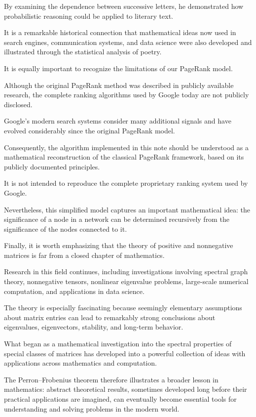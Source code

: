 \documentclass[11pt,a4paper]{article}
\theoremstyle{definition}
\theoremstyle{remark}
\begin{document}
By examining the dependence between
successive letters, he demonstrated
how probabilistic reasoning could
be applied to literary text.

It is a remarkable historical
connection that mathematical ideas
now used in search engines,
communication systems, and data science
were also developed and illustrated
through the statistical analysis
of poetry.

It is equally important to recognize
the limitations of our PageRank model.

Although the original PageRank
method was described in publicly
available research, the complete
ranking algorithms used by Google
today are not publicly disclosed.

Google's modern search systems
consider many additional signals
and have evolved considerably
since the original PageRank model.

Consequently, the algorithm
implemented in this note should
be understood as a mathematical
reconstruction of the classical
PageRank framework, based on its
publicly documented principles.

It is not intended to reproduce
the complete proprietary ranking
system used by Google.

Nevertheless, this simplified
model captures an important
mathematical idea: the significance
of a node in a network can be
determined recursively from
the significance of the
nodes connected to it.

Finally, it is worth emphasizing
that the theory of positive and
nonnegative matrices is far
from a closed chapter of mathematics.

Research in this field continues,
including investigations involving
spectral graph theory, nonnegative
tensors, nonlinear eigenvalue problems,
large-scale numerical computation,
and applications in data science.

The theory is especially fascinating
because seemingly elementary
assumptions about matrix entries
can lead to remarkably strong
conclusions about eigenvalues,
eigenvectors, stability,
and long-term behavior.

What began as a mathematical
investigation into the spectral
properties of special classes
of matrices has developed into
a powerful collection of ideas
with applications across
mathematics and computation.

The Perron--Frobenius theorem
therefore illustrates a broader
lesson in mathematics:
abstract theoretical results,
sometimes developed long before
their practical applications
are imagined, can eventually
become essential tools
for understanding and solving
problems in the modern world.
\end{document}
